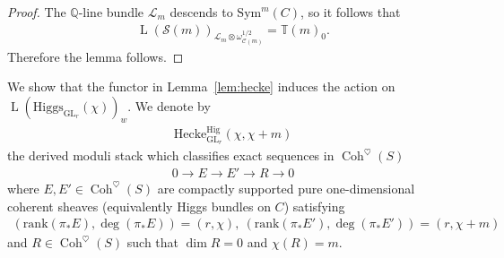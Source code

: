 \documentclass [11pt,oneside,a4paper,mathscr]{amsart}
\theoremstyle{definition}
\newcommand{\LL}{\operatorname{L}}
\newcommand{\Coh}{\operatorname{Coh}}
\newcommand{\GL}{\operatorname{GL}}
\newcommand{\Hig}{\mathrm{Higgs}}
\begin{document}
\begin{proof}
    The $\mathbb{Q}$-line bundle $\mathcal{L}_m$ descends to $\mathrm{Sym}^m(C)$, 
    so it follows that 
    \begin{align*}
        \LL(\mathcal{S}(m))_{\mathcal{L}_m\otimes \omega_{\mathcal{C}(m)}^{1/2}}=\mathbb{T}(m)_0. 
    \end{align*}
    Therefore the lemma follows. 
\end{proof}

We show that the functor in Lemma~\ref{lem:hecke} induces the action on 
$\LL(\Hig_{\GL_r}(\chi))_w$. 
We denote by
\begin{align*}
    \mathrm{Hecke}_{\GL_r}^{\mathrm{Hig}}(\chi, \chi+m)
\end{align*}
the derived moduli stack which classifies exact sequences 
in $\Coh^{\heartsuit}(S)$
\begin{align}\label{exact:R}
    0 \to E \to E' \to R \to 0
\end{align}
where $E, E'\in \Coh^{\heartsuit}(S)$ are compactly supported pure one-dimensional
coherent sheaves (equivalently Higgs bundles on $C$)
satisfying 
\begin{align*}
(\mathrm{rank}(\pi_{\ast}E), \deg(\pi_{*}E))=(r, \chi), \ 
(\mathrm{rank}(\pi_{\ast}E'), \deg(\pi_{*}E'))=(r, \chi+m)
\end{align*}
and $R\in \Coh^{\heartsuit}(S)$ such that $\dim R=0$ and $\chi(R)=m$. 
\end{document}
